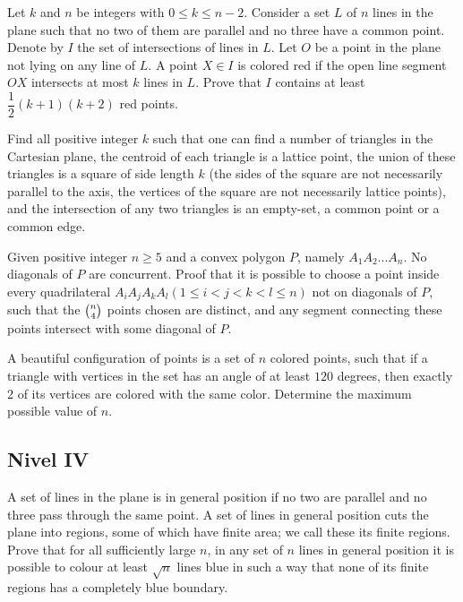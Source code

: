 \documentclass[11pt]{scrartcl}
\begin{document}
\begin{problem} %
    Let $ k$ and $ n$ be integers with $ 0\le k\le n - 2$. Consider a set $ L$ of $ n$ lines in the plane such that no two of them are parallel and no three have a common point. Denote by $ I$ the set of intersections of lines in $ L$. Let $ O$ be a point in the plane not lying on any line of $ L$. A point $ X\in I$ is colored red if the open line segment $ OX$ intersects at most $ k$ lines in $ L$. Prove that $ I$ contains at least $ \dfrac{1}{2}(k + 1)(k + 2)$ red points.
\end{problem}

\begin{problem} %
    Find all positive integer $k$ such that one can find a number of triangles in the Cartesian plane, the centroid of each triangle is a lattice point, the union of these triangles is a square of side length $k$ (the sides of the square are not necessarily parallel to the axis, the vertices of the square are not necessarily lattice points), and the intersection of any two triangles is an empty-set, a common point or a common edge.
\end{problem}

\begin{problem} %
    	Given positive integer $ n \ge 5 $ and a convex polygon $P$, namely $ A_1A_2...A_n $. No diagonals of $P$ are concurrent. Proof that it is possible to choose a point inside every quadrilateral $ A_iA_jA_kA_l (1\le i<j<k<l\le n) $ not on diagonals of $P$, such that the $ \tbinom{n}{4} $ points chosen are distinct, and any segment connecting these points intersect with some diagonal of $P$.
\end{problem}

\begin{problem} %
    A beautiful configuration of points is a set of $n$ colored points, such that if a triangle with vertices in the set has an angle of at least $120$ degrees, then exactly 2 of its vertices are colored with the same color. Determine the maximum possible value of $n$.
\end{problem}

\subsection{Nivel IV}

\begin{problem} %
    A set of lines in the plane is in general position if no two are parallel and no three pass through the same point. A set of lines in general position cuts the plane into regions, some of which have finite area; we call these its finite regions. Prove that for all sufficiently large $n$, in any set of $n$ lines in general position it is possible to colour at least $\sqrt{n}$ lines blue in such a way that none of its finite regions has a completely blue boundary.
\end{problem}
\end{document}
